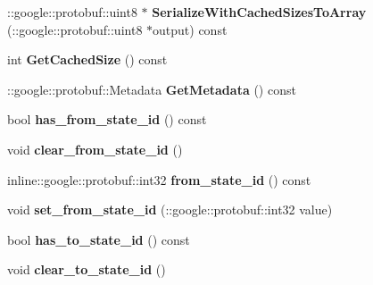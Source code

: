 \begin{DoxyCompactItemize}
\item 
\hypertarget{classgraph_1_1EdgeStatePotential_a33c5ffdfb724a6abafecd982ea9d2f1d}{
::google::protobuf::uint8 $\ast$ {\bfseries SerializeWithCachedSizesToArray} (::google::protobuf::uint8 $\ast$output) const }
\label{classgraph_1_1EdgeStatePotential_a33c5ffdfb724a6abafecd982ea9d2f1d}

\item 
\hypertarget{classgraph_1_1EdgeStatePotential_acd032f41037bb2d600aead1931aba43c}{
int {\bfseries GetCachedSize} () const }
\label{classgraph_1_1EdgeStatePotential_acd032f41037bb2d600aead1931aba43c}

\item 
\hypertarget{classgraph_1_1EdgeStatePotential_aedd1ff1e5220e39f32e629f39747e22a}{
::google::protobuf::Metadata {\bfseries GetMetadata} () const }
\label{classgraph_1_1EdgeStatePotential_aedd1ff1e5220e39f32e629f39747e22a}

\item 
\hypertarget{classgraph_1_1EdgeStatePotential_a5f9ee1db6bb4e2db964624974a6c506f}{
bool {\bfseries has\_\-from\_\-state\_\-id} () const }
\label{classgraph_1_1EdgeStatePotential_a5f9ee1db6bb4e2db964624974a6c506f}

\item 
\hypertarget{classgraph_1_1EdgeStatePotential_a5a02ced96b71190c158d0fb81bf00fd5}{
void {\bfseries clear\_\-from\_\-state\_\-id} ()}
\label{classgraph_1_1EdgeStatePotential_a5a02ced96b71190c158d0fb81bf00fd5}

\item 
\hypertarget{classgraph_1_1EdgeStatePotential_adcdf4b14113ac0259bafb2bf142d19f0}{
inline::google::protobuf::int32 {\bfseries from\_\-state\_\-id} () const }
\label{classgraph_1_1EdgeStatePotential_adcdf4b14113ac0259bafb2bf142d19f0}

\item 
\hypertarget{classgraph_1_1EdgeStatePotential_ab23b81819bc6d9dd71d319c49412c8d8}{
void {\bfseries set\_\-from\_\-state\_\-id} (::google::protobuf::int32 value)}
\label{classgraph_1_1EdgeStatePotential_ab23b81819bc6d9dd71d319c49412c8d8}

\item 
\hypertarget{classgraph_1_1EdgeStatePotential_a1c2e8dc8b84f5aacf08e5c46866f04c6}{
bool {\bfseries has\_\-to\_\-state\_\-id} () const }
\label{classgraph_1_1EdgeStatePotential_a1c2e8dc8b84f5aacf08e5c46866f04c6}

\item 
\hypertarget{classgraph_1_1EdgeStatePotential_a7f30d4b4ff6eb1c6695799be4eeefea5}{
void {\bfseries clear\_\-to\_\-state\_\-id} ()}
\label{classgraph_1_1EdgeStatePotential_a7f30d4b4ff6eb1c6695799be4eeefea5}


\end{DoxyCompactItemize}
